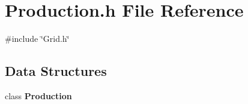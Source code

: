 \section{Production.\+h File Reference}
\label{Production_8h}
{\ttfamily \#include \char`\"{}Grid.\+h\char`\"{}}\newline
\subsection*{Data Structures}
\begin{DoxyCompactItemize}
\item 
class \textbf{ Production}
\end{DoxyCompactItemize}
